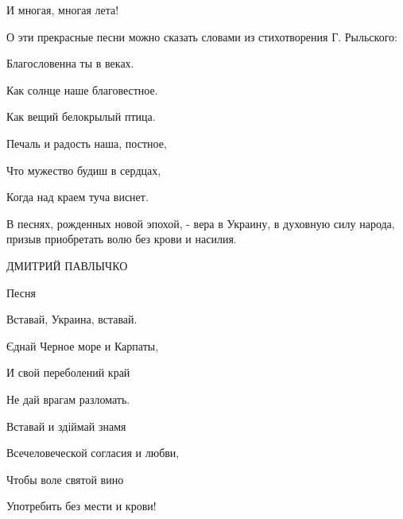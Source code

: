 И многая, многая лета!



О эти прекрасные песни можно сказать словами из стихотворения Г. Рыльского:



Благословенна ты в веках.



Как солнце наше благовестное.



Как вещий белокрылый птица.



Печаль и радость наша, постное,



Что мужество будиш в сердцах,



Когда над краем туча виснет.



В песнях, рожденных новой эпохой, - вера в Украину, в духовную силу народа, призыв приобретать волю без крови и насилия.



ДМИТРИЙ ПАВЛЫЧКО



Песня



Вставай, Украина, вставай.



Єднай Черное море и Карпаты,



И свой переболений край



Не дай врагам разломать.



Вставай и здіймай знамя



Всечеловеческой согласия и любви,



Чтобы воле святой вино



Употребить без мести и крови!

